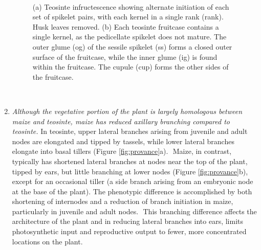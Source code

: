 \documentclass[9pt,twocolumn,twoside]{rilabRxiv}
\begin{document}
\begin{enumerate}
﻿ \begin{figure}
        \caption{\label{fig:teosinte} ﻿(a) Teosinte infructescence showing alternate initiation of each set of spikelet pairs, with each kernel in a single rank (rank). Husk leaves removed. (b) Each teosinte fruitcase contains a single kernel, as the pedicellate spikelet does not mature. The outer glume (og) of the sessile spikelet (ss) forms a closed outer surface of the fruitcase, while the inner glume (ig) is found within the fruitcase. The cupule (cup) forms the other sides of the fruitcase.}
\end{figure}


﻿ \item \textit{Although the vegetative portion of the plant is largely homologous between maize and teosinte, maize has reduced axillary branching compared to teosinte.}
  In teosinte, upper lateral branches arising from juvenile and adult nodes are elongated and tipped by tassels, while lower lateral branches elongate into basal tillers \citep{doebley1997} (Figure \ref{fig:provance}a).
  ﻿ Maize, in contrast, typically has shortened lateral branches at nodes near the top of the plant, tipped by ears, but little branching at lower nodes (Figure \ref{fig:provance}b), except for an occasional tiller (a side branch arising from an embryonic node at the base of the plant).
The phenotypic difference is accomplished by both shortening of internodes and a reduction of branch initiation in maize, particularly in juvenile and adult nodes.
﻿ This branching difference affects the architecture of the plant and in reducing lateral branches into ears, limits photosynthetic input and reproductive output to fewer, more concentrated locations on the plant.

\end{enumerate}
\end{document}
